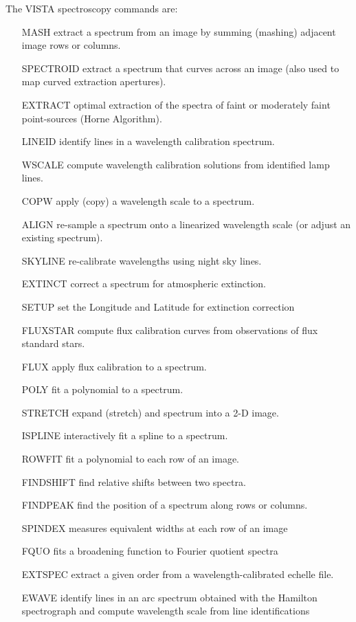 The VISTA spectroscopy commands are:
\begin{itemize}
  \item[MASH\hfill]{extract a spectrum from an image by summing (mashing)
       adjacent image rows or columns.}
  \item[SPECTROID\hfill]{extract a spectrum that curves across an image 
       (also used to map curved extraction apertures).}
  \item[EXTRACT\hfill]{optimal extraction of the spectra of faint or
       moderately faint point-sources (Horne Algorithm).}
  \item[LINEID\hfill]{identify lines in a wavelength calibration spectrum.}
  \item[WSCALE\hfill]{compute wavelength calibration solutions from
       identified lamp lines.}
  \item[COPW\hfill]{apply (copy) a wavelength scale to a spectrum.}
  \item[ALIGN\hfill]{re-sample a spectrum onto a linearized wavelength
       scale (or adjust an existing spectrum).}
  \item[SKYLINE\hfill]{re-calibrate wavelengths using night sky lines.}
  \item[EXTINCT\hfill]{correct a spectrum for atmospheric extinction.}
  \item[SETUP\hfill]{set the Longitude and Latitude for extinction correction}
  \item[FLUXSTAR\hfill]{compute flux calibration curves from observations 
       of flux standard stars.}
  \item[FLUX\hfill]{apply flux calibration to a spectrum.}
  \item[POLY\hfill]{fit a polynomial to a spectrum.}
  \item[STRETCH\hfill]{expand (stretch) and spectrum into a 2-D image.}
  \item[ISPLINE\hfill]{interactively fit a spline to a spectrum.}
  \item[ROWFIT\hfill]{fit a polynomial to each row of an image.}
  \item[FINDSHIFT\hfill]{find relative shifts between two spectra.}
  \item[FINDPEAK\hfill]{find the position of a spectrum along rows or 
       columns.}
  \item[SPINDEX\hfill]{measures equivalent widths at each row of an image}
  \item[FQUO\hfill]{fits a broadening function to Fourier quotient spectra}
  \item[EXTSPEC\hfill]{extract a given order from a wavelength-calibrated
       echelle file.}
  \item[EWAVE\hfill]{identify lines in an arc spectrum obtained with the
        Hamilton spectrograph and compute wavelength scale from line
        identifications}
\end{itemize}


